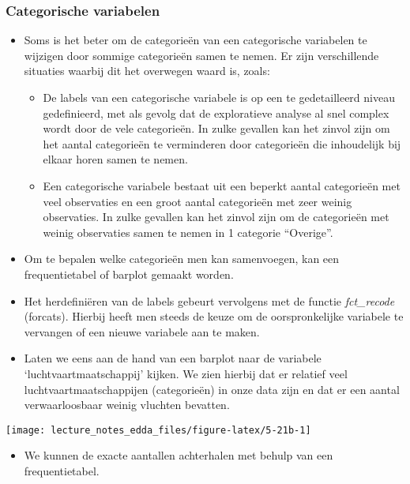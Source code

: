 \documentclass[]{memoir}
\providecommand{\tightlist}{%
  \setlength{\itemsep}{0pt}\setlength{\parskip}{0pt}}
\begin{document}
\hypertarget{categorische-variabelen}{%
\subsubsection{Categorische variabelen}\label{categorische-variabelen}}

\begin{itemize}
\tightlist
\item
  Soms is het beter om de categorieën van een categorische variabelen te wijzigen door sommige categorieën samen te nemen. Er zijn verschillende situaties waarbij dit het overwegen waard is, zoals:

  \begin{itemize}
  \tightlist
  \item
    De labels van een categorische variabele is op een te gedetailleerd niveau gedefinieerd, met als gevolg dat de exploratieve analyse al snel complex wordt door de vele categorieën. In zulke gevallen kan het zinvol zijn om het aantal categorieën te verminderen door categorieën die inhoudelijk bij elkaar horen samen te nemen.
  \item
    Een categorische variabele bestaat uit een beperkt aantal categorieën met veel observaties en een groot aantal categorieën met zeer weinig observaties. In zulke gevallen kan het zinvol zijn om de categorieën met weinig observaties samen te nemen in 1 categorie ``Overige''.
  \end{itemize}
\item
  Om te bepalen welke categorieën men kan samenvoegen, kan een frequentietabel of barplot gemaakt worden.
\item
  Het herdefiniëren van de labels gebeurt vervolgens met de functie \emph{fct\_recode} (forcats). Hierbij heeft men steeds de keuze om de oorspronkelijke variabele te vervangen of een nieuwe variabele aan te maken.
\item
  Laten we eens aan de hand van een barplot naar de variabele `luchtvaartmaatschappij' kijken. We zien hierbij dat er relatief veel luchtvaartmaatschappijen (categorieën) in onze data zijn en dat er een aantal verwaarloosbaar weinig vluchten bevatten.
\end{itemize}

\texttt{[image: lecture\_notes\_edda\_files/figure-latex/5-21b-1]}

\begin{itemize}
\tightlist
\item
  We kunnen de exacte aantallen achterhalen met behulp van een frequentietabel.
\end{itemize}
\end{document}
